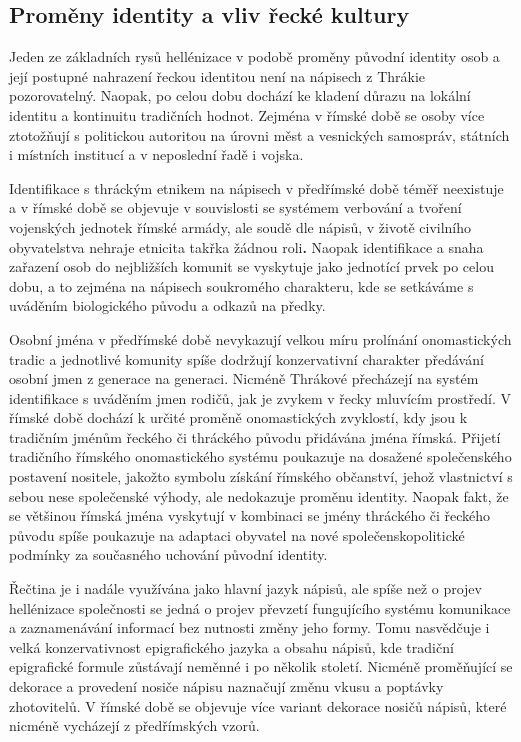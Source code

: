 \subsection[proměny-identity-a-vliv-řecké-kultury]{Proměny identity a vliv řecké kultury}

Jeden ze základních rysů hellénizace v podobě proměny původní identity osob a její postupné nahrazení řeckou identitou není na nápisech z Thrákie pozorovatelný. Naopak, po celou dobu dochází ke kladení důrazu na lokální identitu a kontinuitu tradičních hodnot. Zejména v římské době se osoby více ztotožňují s politickou autoritou na úrovni měst a vesnických samospráv, státních i místních institucí a v neposlední řadě i vojska.

Identifikace s thráckým etnikem na nápisech v předřímské době téměř neexistuje a v římské době se objevuje v souvislosti se systémem verbování a tvoření vojenských jednotek římské armády, ale soudě dle nápisů, v životě civilního obyvatelstva nehraje etnicita takřka žádnou roli{\bf .} Naopak identifikace a snaha zařazení osob do nejbližších komunit se vyskytuje jako jednotící prvek po celou dobu, a to zejména na nápisech soukromého charakteru, kde se setkáváme s uváděním biologického původu a odkazů na předky.

Osobní jména v předřímské době nevykazují velkou míru prolínání onomastických tradic a jednotlivé komunity spíše dodržují konzervativní charakter předávání osobní jmen z generace na generaci. Nicméně Thrákové přecházejí na systém identifikace s uváděním jmen rodičů, jak je zvykem v řecky mluvícím prostředí. V římské době dochází k určité proměně onomastických zvyklostí, kdy jsou k tradičním jménům řeckého či thráckého původu přidávána jména římská. Přijetí tradičního římského onomastického systému poukazuje na dosažené společenského postavení nositele, jakožto symbolu získání římského občanství, jehož vlastnictví s sebou nese společenské výhody, ale nedokazuje proměnu identity. Naopak fakt, že se většinou římská jména vyskytují v kombinaci se jmény thráckého či řeckého původu spíše poukazuje na adaptaci obyvatel na nové společenskopolitické podmínky za současného uchování původní identity.

Řečtina je i nadále využívána jako hlavní jazyk nápisů, ale spíše než o projev hellénizace společnosti se jedná o projev převzetí fungujícího systému komunikace a zaznamenávání informací bez nutnosti změny jeho formy. Tomu nasvědčuje i velká konzervativnost epigrafického jazyka a obsahu nápisů, kde tradiční epigrafické formule zůstávají neměnné i po několik století. Nicméně proměňující se dekorace a provedení nosiče nápisu naznačují změnu vkusu a poptávky zhotovitelů. V římské době se objevuje více variant dekorace nosičů nápisů, které nicméně vycházejí z předřímských vzorů.

